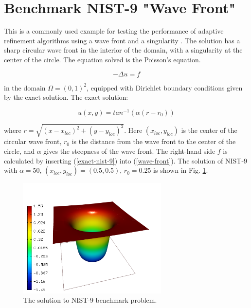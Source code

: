 \section{Benchmark NIST-9 "Wave Front"}
\label{sec:bench-9}

This is a commonly used example for testing the performance of
adaptive refinement algorithms using a wave front and a singularity \cite{mitchell-1, mitchell-2}.
The solution has a sharp circular wave front in the interior of the
domain, with a singularity at the center of the circle.
The equation solved is the Poisson's equation.

\begin{equation} \label{wave-front}
-\Delta u = f 
\end{equation}

in the domain $\Omega = (0, 1)^2$, equipped with Dirichlet boundary conditions
given by the exact solution. The exact solution:

\begin{equation}\label{exact-nist-9}
u(x, y) = tan^{-1}(\alpha (r - r_{0})) 
\end{equation}

where $r = \sqrt{(x - x_{loc})^{2} + (y - y_{loc})^{2}}$.
Here $(x_{loc}, y_{loc})$ is the center of the circular wave front,
$r_{0}$ is the distance from the wave front to the center of the circle,
and $\alpha$ gives the steepness of the wave front.
The right-hand side $f$ is calculated by inserting (\ref{exact-nist-9}) into (\ref{wave-front}).
The solution of NIST-9 with $\alpha = 50$, $(x_{loc}, y_{loc}) = (0.5, 0.5)$,
$r_{0} = 0.25$ is shown in Fig. \ref{fig:sln-nist09}.

\begin{figure}[!ht]
\centering
\includegraphics[height=6cm]{nist/nist-9/solution.png}
\caption{The solution to NIST-9 benchmark problem.}
\label{fig:sln-nist09}
\end{figure}

